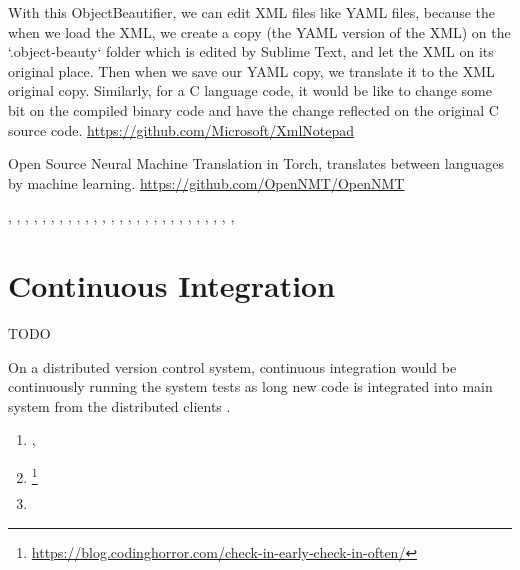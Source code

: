 With this ObjectBeautifier,
we can edit XML files like YAML files,
because the when we load the XML,
we create a copy (the YAML version of the XML) on the `.object-beauty` folder which is edited by Sublime Text,
and let the XML on its original place.
Then when we save our YAML copy,
we translate it to the XML original copy.
Similarly,
for a C language code,
it would be like to change some bit on the compiled binary code and have the change reflected on the original C source code.
\url{https://github.com/Microsoft/XmlNotepad}

Open Source Neural Machine Translation in Torch,
translates between languages by machine learning.
\url{https://github.com/OpenNMT/OpenNMT}



,
,
,
,
,
,
,
,
,
,
,
,
,
,
,
,
,
,
,
,
,
,
,
,
,
,
,



\section{Continuous Integration}

TODO

On a distributed version control system,
continuous integration would be continuously running the system tests
as long new code is integrated into main system
from the distributed clients \cite{continuousIntegration}.

\begin{enumerate}[leftmargin=*]
    \item {},
    \item \footnote{\url{https://blog.codinghorror.com/check-in-early-check-in-often/}}
    \item \cite{aspectOriented}
\end{enumerate}



